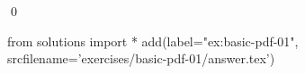 
\begin{ex} 
  \label{ex:basic-pdf-01}
  
  \qed
\end{ex} 
\begin{python0}
from solutions import *
add(label="ex:basic-pdf-01",
    srcfilename='exercises/basic-pdf-01/answer.tex') 
\end{python0}
